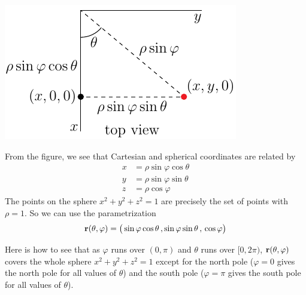 \begin{eg}[Sphere]
\begin{efig}
\begin{center}
    \includegraphics{sphericalTop.pdf}\qquad
\end{center}
\end{efig}
From the figure, we see that Cartesian and spherical coordinates
are related by
\begin{align*}
x&=\rho\sin\varphi\cos\theta \\
y&=\rho\sin\varphi\sin\theta \\
z&=\rho\cos\varphi
\end{align*}
The points on the sphere $x^2+y^2+z^2=1$ are precisely the set of points 
with $\rho=1$. So we can use the parametrization
\begin{equation*}
\mathbf{r}(\theta,\varphi)
=\big(\sin\varphi\cos\theta\,,\sin\varphi\sin\theta\,,\,\cos\varphi\big)
\end{equation*}

Here is how to see that as $\varphi$ runs over $(0,\pi)$ and $\theta$ 
runs over $[0,2\pi)$, $\mathbf{r}(\theta,\varphi)$ covers the whole 
sphere $x^2+y^2+z^2=1$ except for the north pole ($\varphi=0$ gives 
the north pole for all values of $\theta$) and the south pole 
($\varphi=\pi$ gives the south pole for all values of $\theta$). 


\end{eg}
